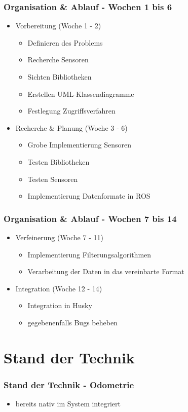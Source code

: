 \documentclass{beamer}
\begin{document}
\begin{frame}
\frametitle{Organisation \& Ablauf - Wochen 1 bis 6}
\begin{itemize}
\item<1-> Vorbereitung (Woche 1 - 2)
\begin{itemize}
\item<2-6> Definieren des Problems
\item<3-6> Recherche Sensoren
\item<4-6> Sichten Bibliotheken
\item<5-6> Erstellen UML-Klassendiagramme
\item<6> Festlegung Zugriffsverfahren
\end{itemize}
\item<7-> Recherche \& Planung (Woche 3 - 6)
\begin{itemize}
\item<8-11> Grobe Implementierung Sensoren
\item<9-11> Testen Bibliotheken
\item<10-11> Testen Sensoren
\item<11> Implementierung Datenformate in ROS
\end{itemize}
\end{itemize}
\end{frame}

\begin{frame}
\frametitle{Organisation \& Ablauf - Wochen 7 bis 14}
\begin{itemize}
\item<1-> Verfeinerung (Woche 7 - 11)
\begin{itemize}
\item<2-3> Implementierung Filterungsalgorithmen
\item<3> Verarbeitung der Daten in das vereinbarte Format
\end{itemize}
\item<4-> Integration (Woche 12 - 14)
\begin{itemize}
\item<5-6> Integration in Husky
\item<6> gegebenenfalls Bugs beheben
\end{itemize}
\end{itemize}
\end{frame}

\section{Stand der Technik}
\begin{frame}
\frametitle{Stand der Technik - Odometrie}
\begin{itemize}
\item<1> bereits nativ im System integriert
\end{itemize}
\end{frame}
\end{document}
